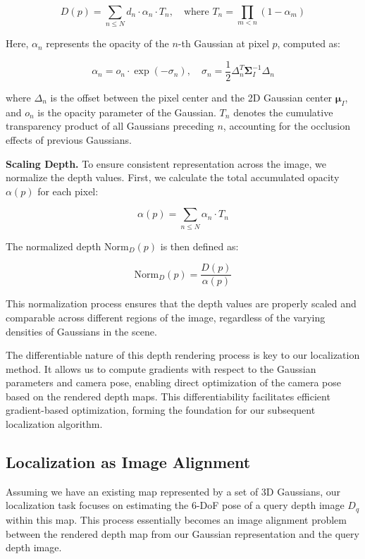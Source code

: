 \documentclass[twocolumn]{article} %
\begin{document}
\[D(p) = \sum_{n \leq N} d_n \cdot \alpha_n \cdot T_n, \quad \text{where } T_n = \prod_{m<n} (1 - \alpha_m)\]

Here, \(\alpha_n\) represents the opacity of the \(n\)-th Gaussian at
pixel \(p\), computed as:

\[\alpha_n = o_n \cdot \exp(-\sigma_n), \quad \sigma_n = \frac{1}{2} \Delta_n^T \boldsymbol{\Sigma}_I^{-1} \Delta_n\]

where \(\Delta_n\) is the offset between the pixel center and the 2D
Gaussian center \(\boldsymbol{\mu}_I\), and \(o_n\) is the opacity
parameter of the Gaussian. \(T_n\) denotes the cumulative transparency
product of all Gaussians preceding \(n\), accounting for the occlusion
effects of previous Gaussians.

\textbf{Scaling Depth.} To ensure consistent representation across the
image, we normalize the depth values. First, we calculate the total
accumulated opacity \(\alpha(p)\) for each pixel:

\[\alpha(p) = \sum_{n \leq N} \alpha_n \cdot T_n\]

The normalized depth \(\text{Norm}_D(p)\) is then defined as:

\[\text{Norm}_D(p) = \frac{D(p)}{\alpha(p)}\]

This normalization process ensures that the depth values are properly
scaled and comparable across different regions of the image, regardless
of the varying densities of Gaussians in the scene.

The differentiable nature of this depth rendering process is key to our
localization method. It allows us to compute gradients with respect to
the Gaussian parameters and camera pose, enabling direct optimization of
the camera pose based on the rendered depth maps. This differentiability
facilitates efficient gradient-based optimization, forming the
foundation for our subsequent localization algorithm.

\subsection{Localization as Image
Alignment}\label{localization-as-image-alignment}

Assuming we have an existing map represented by a set of 3D Gaussians,
our localization task focuses on estimating the 6-DoF pose of a query
depth image \(D_q\) within this map. This process essentially becomes an
image alignment problem between the rendered depth map from our Gaussian
representation and the query depth image.
\end{document}
